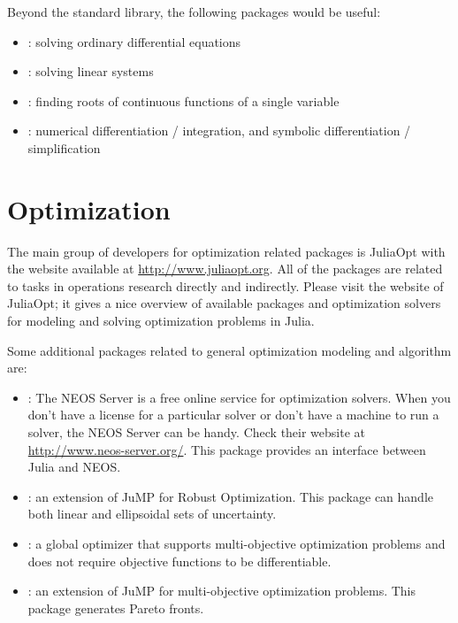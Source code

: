 Beyond the standard library, the following packages would be useful:
\begin{itemize}
\item \href{https://github.com/JuliaLang/ODE.jl}{}: solving ordinary differential equations
\item \href{https://github.com/JuliaLang/IterativeSolvers.jl}{}: solving linear systems
\item \href{https://github.com/JuliaLang/Roots.jl}{}: finding roots of continuous functions of a single variable
\item \href{https://github.com/johnmyleswhite/Calculus.jl}{}: numerical differentiation / integration, and symbolic differentiation / simplification
\end{itemize}



\section{Optimization}

The main group of developers for optimization related packages is JuliaOpt with the website available at \url{http://www.juliaopt.org}. All of the packages are related to tasks in operations research directly and indirectly. Please visit the website of JuliaOpt; it gives a nice overview of available packages and optimization solvers for modeling and solving optimization problems in Julia.

Some additional packages related to general optimization modeling and algorithm are:
\begin{itemize}
\item \href{https://github.com/odow/NEOS.jl}{}: The NEOS Server is a free online service for optimization solvers. When you don't have a license for a particular solver or don't have a machine to run a solver, the NEOS Server can be handy. Check their website at \url{http://www.neos-server.org/}. This package provides an interface between Julia and NEOS.
\item \href{https://github.com/IainNZ/JuMPeR.jl}{}: an extension of JuMP for Robust Optimization. This package can handle both linear and ellipsoidal sets of uncertainty.
\item \href{https://github.com/robertfeldt/BlackBoxOptim.jl}{}: a global optimizer that supports multi-objective optimization problems and does not require objective functions to be differentiable.
\item \href{https://github.com/anriseth/MultiJuMP.jl}{}: an extension of JuMP for multi-objective optimization problems. This package generates Pareto fronts.
\end{itemize}

